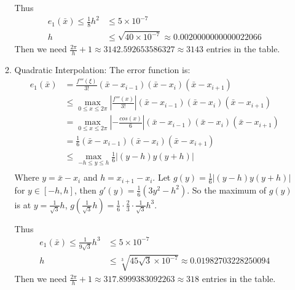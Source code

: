 \documentclass[conference,onecolumn]{IEEEtran}
\begin{document}
\begin{enumerate}[label=\arabic{enumi}.]
\begin{enumerate}
                    Thus
                    \begin{align*}
                        e_1(\bar{x}) \leq \frac{1}{8} h^2 & \leq 5 \times 10^{-7}                                       \\
                        h                                 & \leq \sqrt{40 \times 10^{-7}} \approx 0.0020000000000022066
                    \end{align*}
                    Then we need $\frac{2\pi}{h} + 1 \approx 3142.592653586327 \approx 3143$ entries in the table.
              \item Quadratic Interpolation:
                    The error function is:
                    \begin{align*}
                        e_1(\bar{x}) & = \frac{f'''(\xi)}{3!}(\bar{x} - x_{i-1})(\bar{x} - x_i)(\bar{x} - x_{i+1})                                  \\
                                     & \leq \max_{0 \leq x \leq 2 \pi} |\frac{f'''(x)}{3!}| (\bar{x} - x_{i-1})(\bar{x} - x_{i})(\bar{x} - x_{i+1}) \\
                                     & = \max_{0 \leq x \leq 2 \pi} |-\frac{cos(x)}{6}| (\bar{x} - x_{i-1})(\bar{x} - x_{i})(\bar{x} - x_{i+1})     \\
                                     & = \frac{1}{6} (\bar{x} - x_{i-1})(\bar{x} - x_{i})(\bar{x} - x_{i+1})                                        \\
                                     & \leq \max_{-h \leq y \leq h} \frac{1}{6} |(y - h)y(y + h)|                                                   \\
                    \end{align*}
                    Where $y = \bar{x} - x_{i}$ and $h = x_{i+1} - x_i$.
                    Let $g(y) = \frac{1}{6} |(y - h)y(y + h)|$ for $y \in [-h, h]$, then $g'(y) = \frac{1}{6}(3y^2 - h^2)$.
                    So the maximum of $g(y)$ is at $y = \frac{1}{\sqrt{3}}h$, $g(\frac{1}{\sqrt{3}}h) = \frac{1}{6} \cdot \frac{2}{3} \cdot \frac{1}{\sqrt{3}} h^3$.

                    Thus
                    \begin{align*}
                        e_1(\bar{x}) \leq \frac{1}{9\sqrt{3}}h^3 & \leq 5 \times 10^{-7}                                                \\
                        h                                        & \leq \sqrt[3]{45\sqrt{3} \times 10^{-7}} \approx 0.01982703228250094
                    \end{align*}
                    Then we need $\frac{2\pi}{h} + 1 \approx 317.8999383092263 \approx 318$ entries in the table.
          \end{enumerate}


\end{enumerate}
\end{document}
